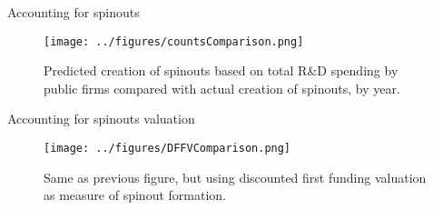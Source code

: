 \documentclass[english,usenames,dvipsnames]{beamer}
\begin{document}
\begin{frame}{Accounting for spinouts}
\begin{figure}
	\texttt{[image: ../figures/countsComparison.png]}
	\caption{Predicted creation of spinouts based on total R\&D spending by public firms compared with actual creation of spinouts, by year.}
\end{figure}
\end{frame}

\begin{frame}{Accounting for spinouts valuation}
\begin{figure}
	\texttt{[image: ../figures/DFFVComparison.png]}
	\caption{Same as previous figure, but using discounted first funding valuation as measure of spinout formation.}
\end{figure}
\end{frame}
\end{document}
